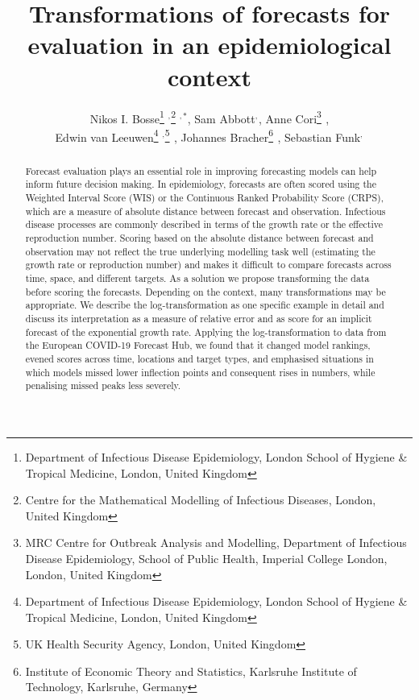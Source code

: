 \documentclass{article}
\begin{document}
\title{Transformations of forecasts for evaluation in an epidemiological context}
  \author{Nikos I. Bosse\thanks{Department of Infectious Disease Epidemiology, London School of Hygiene \& Tropical Medicine, London, United Kingdom} $^{,}$\thanks{Centre for the Mathematical Modelling of Infectious Diseases, London, United Kingdom} $^{,*}$, 
  Sam Abbott\footnotemark[1] $^{,}$\footnotemark[2]$ ^{}$, 
  Anne Cori\thanks{MRC Centre for Outbreak Analysis and Modelling, Department of Infectious Disease Epidemiology, School of Public Health, Imperial College London, London, United Kingdom} $^{}$, \\
  Edwin van Leeuwen\thanks{Department of Infectious Disease Epidemiology, London School of Hygiene \& Tropical Medicine, London, United Kingdom} $^{,}$\thanks{UK Health Security Agency, London, United Kingdom} $^{}$, 
  Johannes Bracher\thanks{Institute of Economic Theory and Statistics, Karlsruhe Institute of Technology, Karlsruhe, Germany} $^{}$, 
  Sebastian Funk\footnotemark[1] $^{,}$\footnotemark[2]$ ^{}$}



\maketitle
\begin{abstract}
Forecast evaluation plays an essential role in improving forecasting models can help inform future decision making. In epidemiology, forecasts are often scored using the Weighted Interval Score (WIS) or the Continuous Ranked Probability Score (CRPS), which are a measure of absolute distance between forecast and observation. Infectious disease processes are commonly described in terms of the growth rate or the effective reproduction number. Scoring based on the absolute distance between forecast and observation may not reflect the true underlying modelling task well (estimating the growth rate or reproduction number) and makes it difficult to compare forecasts across time, space, and different targets. As a solution we propose transforming the data before scoring the forecasts. Depending on the context, many transformations may be appropriate. We describe the log-transformation as one specific example in detail and discuss its interpretation as a measure of relative error and as score for an implicit forecast of the exponential growth rate. Applying the log-transformation to data from the European COVID-19 Forecast Hub, we found that it changed model rankings, evened scores across time, locations and target types, and emphasised situations in which models missed lower inflection points and consequent rises in numbers, while penalising missed peaks less severely. 
\end{abstract}
\end{document}
